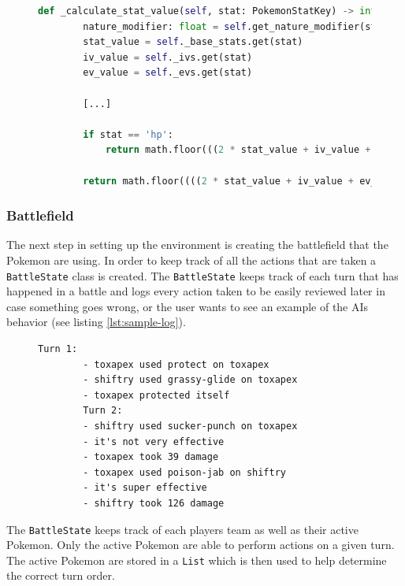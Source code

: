 \begin{figure}[h]
    \centering
    \begin{lstlisting}[basicstyle=\fontsize{10}{10}\selectfont\ttfamily,language=Python,caption={Function for calculating a Pokemon's stats.},label=lst:stat-calc,breaklines]
    def _calculate_stat_value(self, stat: PokemonStatKey) -> int:
        nature_modifier: float = self.get_nature_modifier(stat)
        stat_value = self._base_stats.get(stat)
        iv_value = self._ivs.get(stat)
        ev_value = self._evs.get(stat)
    
        [...]
    
        if stat == 'hp':
            return math.floor(((2 * stat_value + iv_value + ev_value // 4) * self.level // 100) + self.level + 10)
            
        return math.floor((((2 * stat_value + iv_value + ev_value // 4) * self.level // 100) + 5) * nature_modifier)
    \end{lstlisting}
\end{figure}

\subsubsection{Battlefield}
The next step in setting up the environment is creating the battlefield that the Pokemon are using. In order to keep track
of all the actions that are taken a \lstinline|BattleState| class is created. The \lstinline|BattleState| keeps track of
each turn that has happened in a battle and logs every action taken to be easily reviewed later in case something goes wrong,
or the user wants to see an example of the AIs behavior (see listing \ref{lst:sample-log}).
\begin{figure}[H]
    \centering
    \begin{lstlisting}[caption={Sample log from an episode.},label=lst:sample-log,breaklines]
        Turn 1:
        - toxapex used protect on toxapex
        - shiftry used grassy-glide on toxapex
        - toxapex protected itself
        Turn 2:
        - shiftry used sucker-punch on toxapex
        - it's not very effective
        - toxapex took 39 damage
        - toxapex used poison-jab on shiftry
        - it's super effective
        - shiftry took 126 damage
    \end{lstlisting}
\end{figure}

The \lstinline|BattleState| keeps track of each players team as well as their active Pokemon. Only the active Pokemon are able to
perform actions on a given turn. The active Pokemon are stored in a \lstinline|List| which is then used to help determine
the correct turn order.

